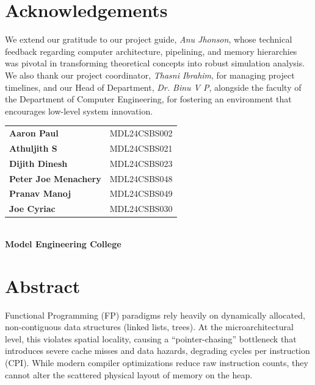 \documentclass[12pt, a4paper]{report}
\begin{document}
\newpage

\chapter*{Acknowledgements}
\thispagestyle{fancy}
We extend our gratitude to our project guide, \textit{Anu Jhonson}, whose technical feedback regarding computer architecture, pipelining, and memory hierarchies was pivotal in transforming theoretical concepts into robust simulation analysis. We also thank our project coordinator, \textit{Thasni Ibrahim}, for managing project timelines, and our Head of Department, \textit{Dr. Binu V P}, alongside the faculty of the Department of Computer Engineering, for fostering an environment that encourages low-level system innovation.

\vspace{0.5cm}
\begin{flushright}
    {\small 
    \begin{tabular}{l l}
        \textbf{Aaron Paul} & MDL24CSBS002 \\
        \textbf{Athuljith S} & MDL24CSBS021 \\
        \textbf{Dijith Dinesh} & MDL24CSBS023 \\
        \textbf{Peter Joe Menachery} & MDL24CSBS048 \\
        \textbf{Pranav Manoj} & MDL24CSBS049 \\
        \textbf{Joe Cyriac} & MDL24CSBS030 \\
    \end{tabular}
    \vspace{0.2cm} \\
    \textbf{Model Engineering College}
    } 
\end{flushright}

\newpage

\chapter*{Abstract}
Functional Programming (FP) paradigms rely heavily on dynamically allocated, non-contiguous data structures (linked lists, trees). At the microarchitectural level, this violates spatial locality, causing a ``pointer-chasing'' bottleneck that introduces severe cache misses and data hazards, degrading cycles per instruction (CPI). While modern compiler optimizations reduce raw instruction counts, they cannot alter the scattered physical layout of memory on the heap.
\end{document}
